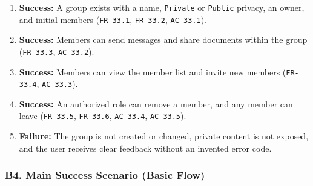 \documentclass[12pt]{article}
\begin{document}
\begin{enumerate}
\item \textbf{Success:} A group exists with a name, \texttt{Private} or \texttt{Public} privacy, an owner, and initial members (\texttt{FR-33.1}, \texttt{FR-33.2}, \texttt{AC-33.1}).
\item \textbf{Success:} Members can send messages and share documents within the group (\texttt{FR-33.3}, \texttt{AC-33.2}).
\item \textbf{Success:} Members can view the member list and invite new members (\texttt{FR-33.4}, \texttt{AC-33.3}).
\item \textbf{Success:} An authorized role can remove a member, and any member can leave (\texttt{FR-33.5}, \texttt{FR-33.6}, \texttt{AC-33.4}, \texttt{AC-33.5}).
\item \textbf{Failure:} The group is not created or changed, private content is not exposed, and the user receives clear feedback without an invented error code.
\end{enumerate}
\par\medskip

\hypertarget{sec:b4-main-success-scenario-basic-flow}{}
\subsubsection*{B4. Main Success Scenario (Basic Flow)}
\par\medskip
\end{document}

